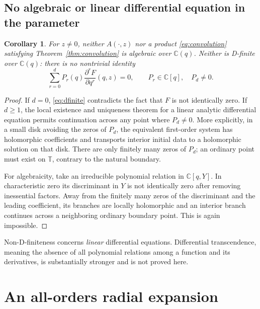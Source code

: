 \documentclass[11pt,a4paper]{article}
\numberwithin{equation}{section}
\newtheorem{corollary}[theorem]{Corollary}
\theoremstyle{definition}
\theoremstyle{remark}
\newcommand{\C}{\mathbb C}
\newcommand{\T}{\mathbb T}
\begin{document}
\subsection{No algebraic or linear differential equation in the parameter}
\begin{corollary}\label{cor:dfinite}
For \(z\ne0\), neither \(A(\cdot,z)\) nor a product \eqref{eq:convolution} satisfying Theorem~\ref{thm:convolution} is algebraic over \(\C(q)\). Neither is D-finite over \(\C(q)\): there is no nontrivial identity
\begin{equation}\label{eq:dfinite}
 \sum_{r=0}^d P_r(q)\frac{\partial^r F}{\partial q^r}(q,z)=0,
 \qquad P_r\in\C[q],\quad P_d\ne0.
\end{equation}
\end{corollary}
\begin{proof}
If \(d=0\), \eqref{eq:dfinite} contradicts the fact that \(F\) is not identically zero. If \(d\ge1\), the local existence and uniqueness theorem for a linear analytic differential equation permits continuation across any point where \(P_d\ne0\). More explicitly, in a small disk avoiding the zeros of \(P_d\), the equivalent first-order system has holomorphic coefficients and transports interior initial data to a holomorphic solution on that disk. There are only finitely many zeros of \(P_d\); an ordinary point must exist on \(\T\), contrary to the natural boundary.

For algebraicity, take an irreducible polynomial relation in \(\C[q,Y]\). In characteristic zero its discriminant in \(Y\) is not identically zero after removing inessential factors. Away from the finitely many zeros of the discriminant and the leading coefficient, its branches are locally holomorphic and an interior branch continues across a neighboring ordinary boundary point. This is again impossible.
\end{proof}

Non-D-finiteness concerns \emph{linear} differential equations. Differential transcendence, meaning the absence of all polynomial relations among a function and its derivatives, is substantially stronger and is not proved here.

\section{An all-orders radial expansion}
\end{document}
